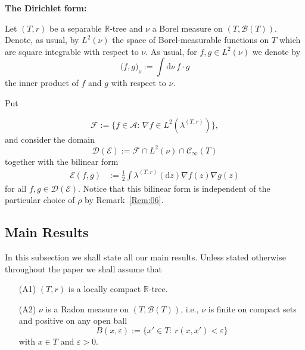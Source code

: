 \documentclass[11pt]{amsart}
\numberwithin{equation}{section}
\begin{document}
 \medskip
{\bf The Dirichlet form: } {Let $(T,r)$ be a separable $\mathbb{R}$-tree and $\nu$ a Borel measure on $(T,{\mathcal B}(T))$. Denote, as usual,  by $L^2(\nu)$ the space of Borel-measurable functions on $T$ which are square integrable with respect to $\nu$. As usual, for $f,g\in L^2(\nu)$ we denote by
\begin{equation}
\label{e:inner}
   \big(f,g\big)_\nu:=\int\mathrm{d}\nu\,f\cdot g
\end{equation}
the {{\it} inner product} of $f$ and $g$ with respect to $\nu$.

Put}
\begin{equation}
\label{e:F}
   {\mathcal F}:=
   \big\{f \in {\mathcal A}:\, \nabla f\in L^2(\lambda^{(T,r)})\big\},
\end{equation}
and consider the domain
\begin{equation}
\label{domainp}
   {\mathcal D}(\mathcal E)
 :=
   
   {\mathcal F} \cap L^2(\nu) \cap   {\mathcal C}_{\infty}(T)
   
   
\end{equation}
together with the bilinear form
\begin{equation}\label{con.2p}
\begin{aligned}
   {\mathcal E}(f,g)
 &:=
   \frac{1}{2}\int\lambda^{(T,r)}(\mathrm{d}z)\nabla f(z)
   \nabla g(z)
\end{aligned}
\end{equation}
for all $f,g\in{\mathcal D}({\mathcal E})$.
{Notice that this bilinear form is independent of the particular choice of $\rho$ by Remark~\ref{Rem:06}.}
{\smallskip}

\subsection{Main Results}
\label{mainresults}
In this subsection we shall state all our main results.
Unless stated otherwise throughout the paper we shall assume that
\begin{itemize}
\item[(A1)] $(T,r)$ is  a locally compact ${{\mathbb R}}$-tree.
\item[(A2)] $\nu$ is a Radon measure on $(T,{\mathcal B}(T))$, i.e., $\nu$ is finite on compact sets and positive on
any open ball
\begin{equation}
\label{e:ball}
   B(x,\varepsilon)
 :=
   \big\{x'\in T:\,r(x,x')<\varepsilon\big\}
\end{equation}
with $x\in T$ and $\varepsilon>0$.
\end{itemize}
\end{document}
